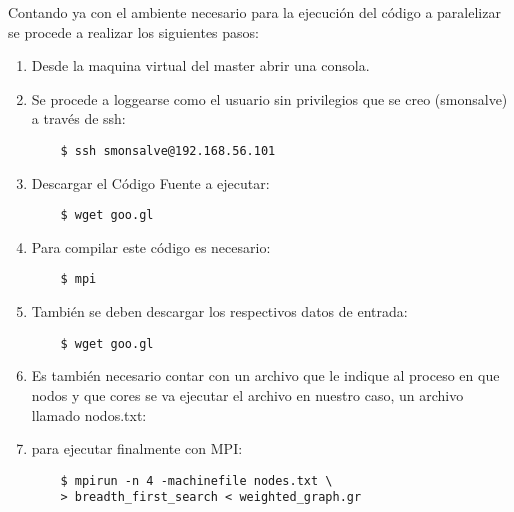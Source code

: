 Contando ya con el ambiente necesario para la ejecución del código a paralelizar se procede a realizar los siguientes pasos: 

\begin{enumerate}

	\item Desde la maquina virtual del master abrir una consola. 

	\item Se procede a loggearse como el usuario sin privilegios que se creo (smonsalve) a través de ssh:

	\begin{verbatim}
	$ ssh smonsalve@192.168.56.101
	\end{verbatim}

	\item Descargar el Código Fuente a ejecutar: 

	\begin{verbatim}
	$ wget goo.gl 
	\end{verbatim}
	

	


	\item Para compilar este código es necesario:


	\begin{verbatim}
	$ mpi
	\end{verbatim}
	


	\item También se deben descargar los respectivos datos de entrada: 

	\begin{verbatim}
	$ wget goo.gl
	\end{verbatim}
	

	
	

	\item Es también necesario contar con un archivo que le indique al proceso en que nodos y que cores se va ejecutar el archivo en nuestro caso, un archivo llamado nodos.txt:

	

	\item para ejecutar finalmente con MPI: 


	\begin{verbatim}
	$ mpirun -n 4 -machinefile nodes.txt \
	> breadth_first_search < weighted_graph.gr
	\end{verbatim}
	

\end{enumerate}
